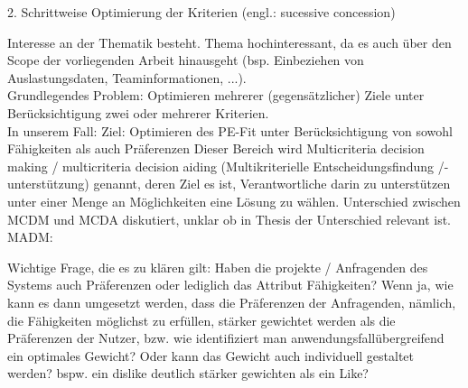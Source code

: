 2. Schrittweise Optimierung der Kriterien (engl.: sucessive concession) %

Interesse an der Thematik besteht. %
Thema hochinteressant, da es auch über den Scope der vorliegenden Arbeit hinausgeht (bsp. Einbeziehen von Auslastungsdaten, Teaminformationen, ...).\\

Grundlegendes Problem: Optimieren mehrerer (gegensätzlicher) Ziele unter Berücksichtigung zwei oder mehrerer Kriterien.\\ %
In unserem Fall: Ziel: Optimieren des PE-Fit unter Berücksichtigung von sowohl Fähigkeiten als auch Präferenzen
Dieser Bereich wird Multicriteria decision making / multicriteria decision aiding (Multikriterielle Entscheidungsfindung /- unterstützung) genannt, deren Ziel es ist, Verantwortliche darin zu unterstützen unter einer Menge an Möglichkeiten eine Lösung zu wählen. Unterschied zwischen MCDM und MCDA diskutiert, unklar ob in Thesis der Unterschied relevant ist. %
MADM: %

Wichtige Frage, die es zu klären gilt: Haben die projekte / Anfragenden des Systems auch Präferenzen oder lediglich das Attribut Fähigkeiten? Wenn ja, wie kann es dann umgesetzt werden, dass die Präferenzen der Anfragenden, nämlich, die Fähigkeiten möglichst zu erfüllen, stärker gewichtet werden als die Präferenzen der Nutzer, bzw. wie identifiziert man anwendungsfallübergreifend ein optimales Gewicht?
Oder kann das Gewicht auch individuell gestaltet werden? bspw. ein dislike deutlich stärker gewichten als ein Like?

